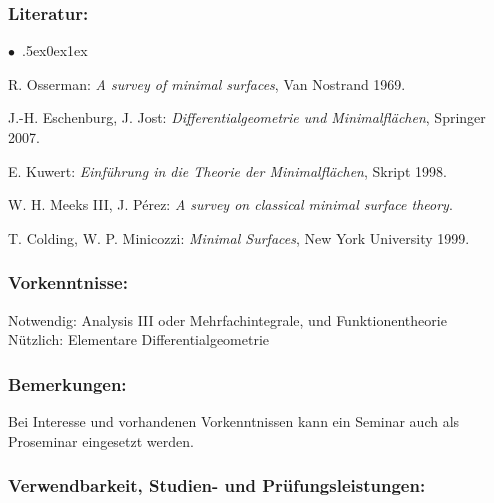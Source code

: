\documentclass[a4paper,10pt]{article}
\renewenvironment{itemize}{\begin{list}{$\bullet$\ }{\itemsep.5ex\setlength{\topsep}{0.5\itemsep}\parsep0ex\labelsep1ex\settowidth{\labelwidth}{$\bullet$\ }\setlength{\leftmargin}{\labelwidth}\addtolength{\leftmargin}{3ex}\addtolength{\leftmargin}{\labelsep}}}{\end{list}}
\begin{document}
\subsubsection*{\large
    Literatur:
}
\begin{itemize}
\item
R. Osserman: \emph{A survey of minimal surfaces}, Van Nostrand 1969. 
\item
J.-H. Eschenburg, J. Jost: \emph{Differentialgeometrie und Minimalflächen}, Springer 2007.
\item
E. Kuwert: \emph{Einführung in die Theorie der Minimalflächen}, Skript 1998.
\item
W. H. Meeks III, J. Pérez: \emph{A survey on classical minimal surface theory}.
\item
T. Colding, W. P. Minicozzi: \emph{Minimal Surfaces}, New York University 1999.
\end{itemize}
\subsubsection*{\large
    Vorkenntnisse:
}
Notwendig: Analysis III oder Mehrfachintegrale, und Funktionentheorie \\ Nützlich: Elementare Differentialgeometrie
\subsubsection*{\large
    Bemerkungen:
}
Bei Interesse und vorhandenen Vorkenntnissen kann ein Seminar auch als Proseminar eingesetzt werden.
\cleardoublepage
\subsubsection*{\large
    Verwendbarkeit, Studien- und Prüfungsleistungen:
}
\end{document}
